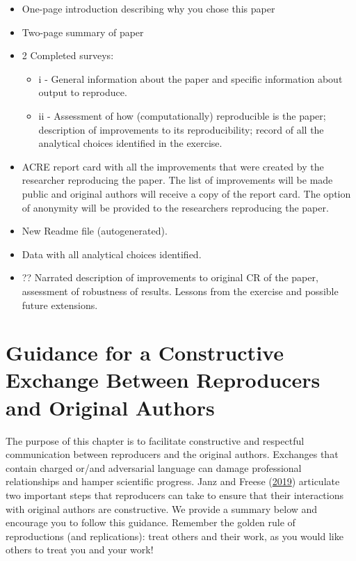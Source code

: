 \documentclass[]{book}
\providecommand{\tightlist}{%
  \setlength{\itemsep}{0pt}\setlength{\parskip}{0pt}}
\begin{document}
\begin{itemize}
\item
  One-page introduction describing why you chose this paper
\item
  Two-page summary of paper
\item
  2 Completed surveys:

  \begin{itemize}
  \tightlist
  \item
    i - General information about the paper and specific
    information about output to reproduce.\\
  \item
    ii - Assessment of how (computationally) reproducible is the paper;
    description of improvements to its reproducibility; record of all the
    analytical choices identified in the exercise.
  \end{itemize}
\item
  ACRE report card with all the improvements that were created by the researcher reproducing the paper. The list of improvements will be made public and original authors will receive a copy of the report card. The option of anonymity will be provided to the researchers reproducing the paper.
\item
  New Readme file (autogenerated).
\item
  Data with all analytical choices identified.
\item
  ?? Narrated description of improvements to original CR of the paper, assessment of robustness of results. Lessons from the exercise and possible future extensions.
\end{itemize}

\hypertarget{guidance-for-a-constructive-exchange-between-reproducers-and-original-authors}{%
\chapter{Guidance for a Constructive Exchange Between Reproducers and Original Authors}\label{guidance-for-a-constructive-exchange-between-reproducers-and-original-authors}}

The purpose of this chapter is to facilitate constructive and respectful communication between reproducers and the original authors. Exchanges that contain charged or/and adversarial language can damage professional relationships and hamper scientific progress. Janz and Freese (\href{https://www.mzes.uni-mannheim.de/openscience/wp-content/uploads/2019/01/Janz-Freese_-Good-and-Bad-Replications-1.pdf}{2019}) articulate two important steps that reproducers can take to ensure that their interactions with original authors are constructive. We provide a summary below and encourage you to follow this guidance. Remember the golden rule of reproductions (and replications): treat others and their work, as you would like others to treat you and your work!
\end{document}
